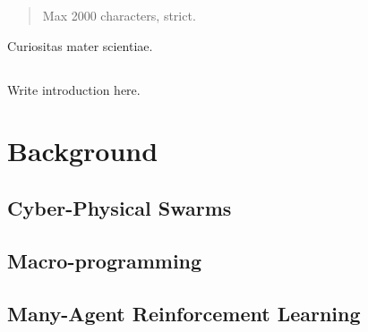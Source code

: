\documentclass[12pt,a4paper,oneside]{book}
\begin{document}
	
\frontmatter



\begin{abstract}	
Max 2000 characters, strict.
\end{abstract}

\begin{dedication} %
Curiositas mater scientiae.
\end{dedication}

\begin{acknowledgements} %
\end{acknowledgements}

\tableofcontents   
\listoffigures     %
\lstlistoflistings %

\mainmatter

\chapter{\introductionname}
\label{chap:introduction}

Write introduction here.
\part{Background}
\chapter{Cyber-Physical Swarms} %
\label{chap:cpsw}
\chapter{Macro-programming} %
\label{chap:macro-programming}
\chapter{Many-Agent Reinforcement Learning}
\label{chap:marl}

\end{document}
